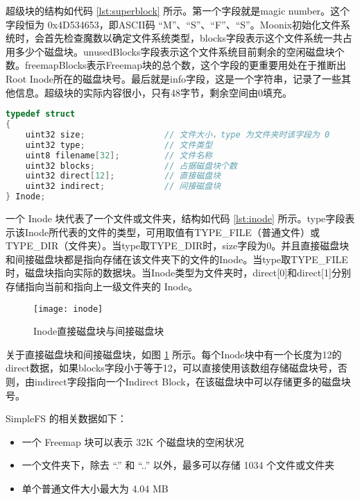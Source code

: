 超级块的结构如代码 \ref{lst:superblock} 所示。第一个字段就是magic number。这个字段恒为 0x4D534653，即ASCII码 “M”、“S”、“F”、“S”。Moonix初始化文件系统时，会首先检查魔数以确定文件系统类型，blocks字段表示这个文件系统一共占用多少个磁盘块。unusedBlocks字段表示这个文件系统目前剩余的空闲磁盘块个数。freemapBlocks表示Freemap块的总个数，这个字段的更重要用处在于推断出Root Inode所在的磁盘块号。最后就是info字段，这是一个字符串，记录了一些其他信息。超级块的实际内容很小，只有48字节，剩余空间由0填充。

\begin{minipage}[c]{0.95\textwidth}
\begin{lstlisting}[language={C}, caption={SimpleFS Inode结构}, label={lst:inode}]
typedef struct
{
	uint32 size;                // 文件大小，type 为文件夹时该字段为 0
	uint32 type;                // 文件类型
	uint8 filename[32];         // 文件名称
	uint32 blocks;              // 占据磁盘块个数
	uint32 direct[12];          // 直接磁盘块
	uint32 indirect;            // 间接磁盘块
} Inode;
\end{lstlisting}
\end{minipage}

一个 Inode 块代表了一个文件或文件夹，结构如代码 \ref{lst:inode} 所示。type字段表示该Inode所代表的文件的类型，可用取值有TYPE\_FILE（普通文件）或TYPE\_DIR（文件夹）。当type取TYPE\_DIR时，size字段为0。并且直接磁盘块和间接磁盘块都是指向存储在该文件夹下的文件的Inode。当type取TYPE\_FILE时，磁盘块指向实际的数据块。当Inode类型为文件夹时，direct[0]和direct[1]分别存储指向当前和指向上一级文件夹的 Inode。

\begin{figure}[htpb]
	\centering
	\texttt{[image: inode]}
	\setlength{\abovecaptionskip}{2pt}
	\caption{Inode直接磁盘块与间接磁盘块}
	\label{pic:inode}
\end{figure}

关于直接磁盘块和间接磁盘块，如图 \ref{pic:inode} 所示。每个Inode块中有一个长度为12的direct数据，如果blocks字段小于等于12，可以直接使用该数组存储磁盘块号，否则，由indirect字段指向一个Indirect Block，在该磁盘块中可以存储更多的磁盘块号。

SimpleFS 的相关数据如下：

\begin{itemize}
	\item 一个 Freemap 块可以表示 32K 个磁盘块的空闲状况
	\item 一个文件夹下，除去 “.” 和 “..” 以外，最多可以存储 1034 个文件或文件夹
	\item 单个普通文件大小最大为 4.04 MB
\end{itemize}

